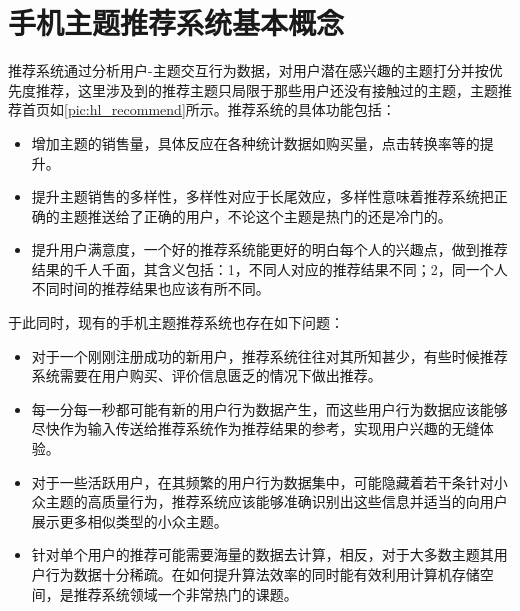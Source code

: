 		\section{手机主题推荐系统基本概念}
		推荐系统通过分析用户-主题交互行为数据，对用户潜在感兴趣的主题打分并按优先度推荐，这里涉及到的推荐主题只局限于那些用户还没有接触过的主题，主题推荐首页如\autoref{pic:hl_recommend}所示。推荐系统的具体功能包括：
		\begin{itemize}
			\item 增加主题的销售量，具体反应在各种统计数据如购买量，点击转换率等的提升。
			\item 提升主题销售的多样性，多样性对应于长尾效应，多样性意味着推荐系统把正确的主题推送给了正确的用户，不论这个主题是热门的还是冷门的。
			\item 提升用户满意度，一个好的推荐系统能更好的明白每个人的兴趣点，做到推荐结果的千人千面，其含义包括：1，不同人对应的推荐结果不同；2，同一个人不同时间的推荐结果也应该有所不同。
		\end{itemize}
		于此同时，现有的手机主题推荐系统也存在如下问题：
		\begin{itemize}
			\item 对于一个刚刚注册成功的新用户，推荐系统往往对其所知甚少，有些时候推荐系统需要在用户购买、评价信息匮乏的情况下做出推荐。
			\item 每一分每一秒都可能有新的用户行为数据产生，而这些用户行为数据应该能够尽快作为输入传送给推荐系统作为推荐结果的参考，实现用户兴趣的无缝体验。
			\item 对于一些活跃用户，在其频繁的用户行为数据集中，可能隐藏着若干条针对小众主题的高质量行为，推荐系统应该能够准确识别出这些信息并适当的向用户展示更多相似类型的小众主题。
			\item 针对单个用户的推荐可能需要海量的数据去计算，相反，对于大多数主题其用户行为数据十分稀疏。在如何提升算法效率的同时能有效利用计算机存储空间，是推荐系统领域一个非常热门的课题。
		\end{itemize}

